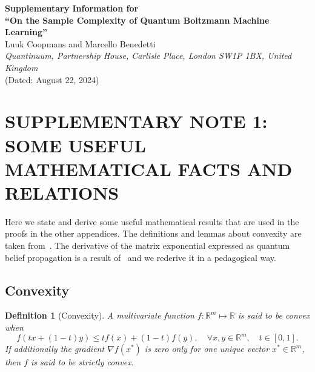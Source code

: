 \documentclass[
    reprint,
    aps,
    prx,
    longbibliography
]{revtex4-2}
\makeatletter
\newtheorem{definition}{Definition}
\renewcommand{\fnum@figure}{\textbf{Figure \thefigure}}
\makeatother
\begin{document}
\setcounter{figure}{0}
\makeatletter
\renewcommand{\fnum@figure}{\textbf{Supplementary Figure \thefigure}}
\makeatother

\clearpage
\appendix
\onecolumngrid
\begin{center}
	\noindent\textbf{\large{Supplementary Information for\\``On the Sample Complexity of Quantum Boltzmann Machine Learning''}}\\
    \vspace{.5cm}
    Luuk Coopmans and Marcello Benedetti\\
    \small{\textit{Quantinuum, Partnership House, Carlisle Place, London SW1P 1BX, United Kingdom}}\\
    \small{(Dated: August 22, 2024)}
\end{center}

\renewcommand{\baselinestretch}{1.1}\normalsize
\tableofcontents
\renewcommand{\baselinestretch}{1.0}\normalsize

\clearpage

\section*{\MakeUppercase{Supplementary Note 1: Some useful mathematical facts and relations}}

Here we state and derive some useful mathematical results that are used in the proofs in the other appendices. The definitions and lemmas about convexity are taken from~\cite{Garrigos2023}. The derivative of the matrix exponential expressed as quantum belief propagation is a result of~\cite{Hastings_2007} and we rederive it in a pedagogical way.

\subsection*{Convexity}

\begin{definition}[Convexity]
\label{def:convexity}
A multivariate function $f:\mathbb{R}^m \mapsto \mathbb{R}$ is said to be convex when 
\begin{equation}
    f(tx + (1-t)y) \leq tf(x) + (1-t)f(y), \quad \forall x, y\in\mathbb{R}^m, \quad t\in [0, 1]. 
\end{equation}
If additionally the gradient $\nabla f(x^*)$ is zero only for one unique vector $x^* \in\mathbb{R}^m$, then $f$ is said to be strictly convex.
\end{definition}
\end{document}
